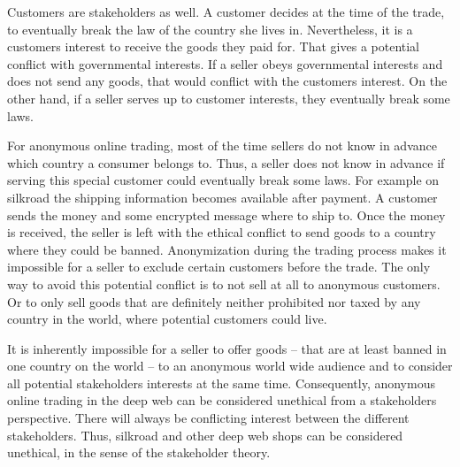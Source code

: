 Customers are stakeholders as well. A customer decides at the time of the trade, to eventually break the law of the country she lives in. Nevertheless, it is a customers interest to receive the goods they paid for. That gives a potential conflict with governmental interests. If a seller obeys governmental interests and does not send any goods, that would conflict with the customers interest. On the other hand, if a seller serves up to customer interests, they eventually break some laws.

For anonymous online trading, most of the time sellers do not know in advance which country a consumer belongs to. Thus, a seller does not know in advance if serving this special customer could eventually break some laws. For example on silkroad the shipping information becomes available after payment. A customer sends the money and some encrypted message where to ship to\cite{silkroad2013}. Once the money is received, the seller is left with the ethical conflict to send goods to a country where they could be banned. Anonymization during the trading process makes it impossible for a seller to exclude certain customers before the trade. The only way to avoid this potential conflict is to not sell at all to anonymous customers. Or to only sell goods that are definitely neither prohibited nor taxed by any country in the world, where potential customers could live.

It is inherently impossible for a seller to offer goods -- that are at least banned in one country on the world -- to an anonymous world wide audience and to consider all potential stakeholders interests at the same time. Consequently, anonymous online trading in the deep web can be considered unethical from a stakeholders perspective. There will always be conflicting interest between the different stakeholders. Thus, silkroad and other deep web shops can be considered unethical, in the sense of the stakeholder theory. 